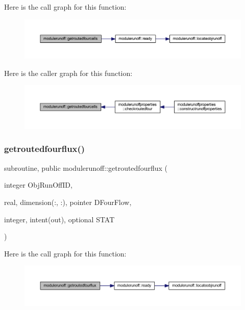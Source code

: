 Here is the call graph for this function\+:\nopagebreak
\begin{figure}[H]
\begin{center}
\leavevmode
\includegraphics[width=350pt]{namespacemodulerunoff_ad1eea51d0c7cb95a4e235e18dad99861_cgraph}
\end{center}
\end{figure}
Here is the caller graph for this function\+:\nopagebreak
\begin{figure}[H]
\begin{center}
\leavevmode
\includegraphics[width=350pt]{namespacemodulerunoff_ad1eea51d0c7cb95a4e235e18dad99861_icgraph}
\end{center}
\end{figure}
\mbox{\label{namespacemodulerunoff_a8e2e0bbd121e81c889fd2cd186c45b5c}} 
\subsubsection{\texorpdfstring{getroutedfourflux()}{getroutedfourflux()}}
{\footnotesize\ttfamily subroutine, public modulerunoff\+::getroutedfourflux (\begin{DoxyParamCaption}\item[{integer}]{Obj\+Run\+Off\+ID,  }\item[{real, dimension(\+:, \+:), pointer}]{D\+Four\+Flow,  }\item[{integer, intent(out), optional}]{S\+T\+AT }\end{DoxyParamCaption})}

Here is the call graph for this function\+:\nopagebreak
\begin{figure}[H]
\begin{center}
\leavevmode
\includegraphics[width=350pt]{namespacemodulerunoff_a8e2e0bbd121e81c889fd2cd186c45b5c_cgraph}
\end{center}
\end{figure}
\mbox{\label{namespacemodulerunoff_a012d41440fbbe25a6de0417a150502fd}} 
